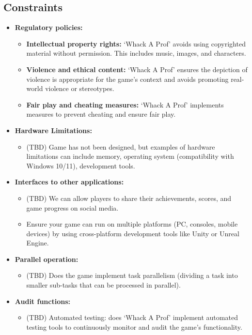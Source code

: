\documentclass{article}
\begin{document}
\subsection{Constraints}
\begin{itemize}
    \item \textbf{Regulatory policies:}
    \begin{itemize}
        \item \textbf{Intellectual property rights:} ‘Whack A Prof’ avoids using copyrighted material without permission. This includes music, images, and characters.
        \item \textbf{Violence and ethical content:} ‘Whack A Prof’ ensures the depiction of violence is appropriate for the game’s context and avoids promoting real-world violence or stereotypes.
        \item \textbf{Fair play and cheating measures:} ‘Whack A Prof’ implements measures to prevent cheating and ensure fair play.
    \end{itemize}
    \item \textbf{Hardware Limitations:}
    \begin{itemize}
        \item (TBD) Game has not been designed, but examples of hardware limitations can include memory, operating system (compatibility with Windows 10/11), development tools.
    \end{itemize}
    \item \textbf{Interfaces to other applications:}
    \begin{itemize}
        \item (TBD) We can allow players to share their achievements, scores, and game progress on social media.
        \item Ensure your game can run on multiple platforms (PC, consoles, mobile devices) by using cross-platform development tools like Unity or Unreal Engine.
    \end{itemize}
    \item \textbf{Parallel operation:}
    \begin{itemize}
        \item (TBD) Does the game implement task parallelism (dividing a task into smaller sub-tasks that can be processed in parallel).
    \end{itemize}
    \item \textbf{Audit functions:}
    \begin{itemize}
        \item (TBD) Automated testing: does ‘Whack A Prof’ implement automated testing tools to continuously monitor and audit the game’s functionality.

\end{itemize}
\end{itemize}
\end{document}
